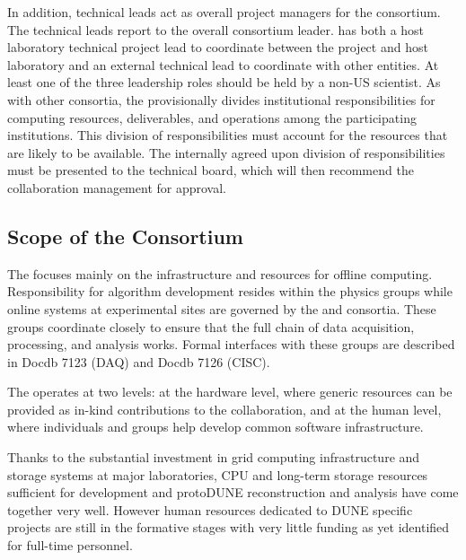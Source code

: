 In addition, technical leads act as overall project managers for the consortium. The technical leads report to the overall consortium leader.
 has both a host laboratory technical project lead to coordinate between the  project and host laboratory and an external technical lead to coordinate with other entities.
At least one of the three leadership roles should be held by a non-US scientist. 
As with other  consortia, the  provisionally divides institutional
responsibilities for computing resources, deliverables, and operations among the participating institutions. This division of responsibilities must account for the resources that are likely to be available. The internally agreed upon division of responsibilities must be presented to the technical board, which will then recommend the collaboration management for approval.


\subsection{Scope of the Consortium}
The  focuses mainly on the infrastructure and resources for offline computing.  Responsibility for algorithm development resides within the physics groups while online systems at experimental sites are governed by the  and  consortia. These groups coordinate closely to ensure that the full chain of data acquisition, processing, and analysis works. Formal interfaces with these groups are described in Docdb 7123 (DAQ)\cite{bib:docdb7123} and Docdb 7126 (CISC)\cite{bib:docdb7126}.

The  operates at two levels: at the hardware level, where generic resources can be provided as in-kind contributions to the collaboration, and at the human level, where individuals and groups help develop common software infrastructure. 

Thanks to the substantial investment in grid computing infrastructure and storage systems at major laboratories, CPU and long-term storage resources sufficient for development and protoDUNE reconstruction and analysis have come together very well.  However human resources dedicated to DUNE specific projects are still in the formative stages with very little funding as yet identified for full-time personnel. 

